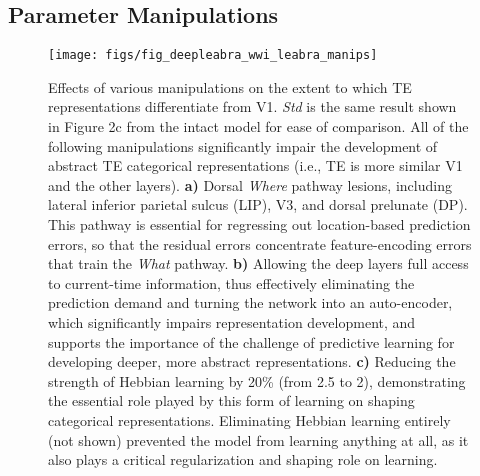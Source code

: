 \documentclass[11pt,twoside]{article}
\newif\myifpdf
\begin{document}
\subsection{Parameter Manipulations}

\begin{figure}
  \centering\texttt{[image: figs/fig\_deepleabra\_wwi\_leabra\_manips]}
  \caption{Effects of various manipulations on the extent to which TE representations differentiate from V1.  \emph{Std} is the same result shown in Figure 2c from the intact model for ease of comparison.  All of the following  manipulations significantly impair the development of abstract TE categorical representations (i.e., TE is more similar V1 and the other layers).  {\bf a)} Dorsal \emph{Where} pathway lesions, including lateral inferior parietal sulcus (LIP), V3, and dorsal prelunate (DP).  This pathway is essential for regressing out location-based prediction errors, so that the residual errors concentrate feature-encoding errors that train the \emph{What} pathway.  {\bf b)} Allowing the deep layers full access to current-time information, thus effectively eliminating the prediction demand and turning the network into an auto-encoder, which significantly impairs representation development, and supports the importance of the challenge of predictive learning for developing deeper, more abstract representations.  {\bf c)} Reducing the strength of Hebbian learning by 20\% (from 2.5 to 2), demonstrating the essential role played by this form of learning on shaping categorical representations.  Eliminating Hebbian learning entirely (not shown) prevented the model from learning anything at all, as it also plays a critical regularization and shaping role on learning.}
  \label{fig.manips}
\end{figure}
\end{document}
